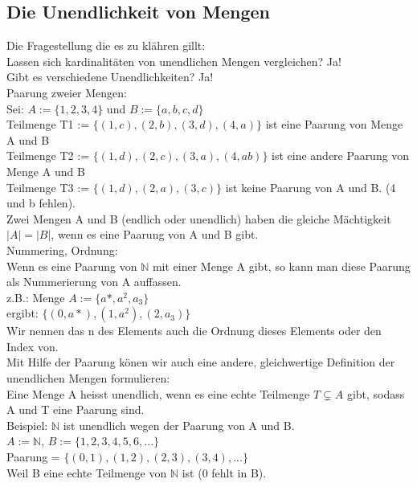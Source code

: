 \documentclass[../gruppenarbeit_1.tex]{subfiles}
\begin{document}
\subsection{Die Unendlichkeit von Mengen}

Die Fragestellung die es zu klähren gillt:\\
Lassen sich kardinalitäten von unendlichen Mengen vergleichen? Ja!\\
Gibt es verschiedene Unendlichkeiten? Ja!\\

Paarung zweier Mengen:\\
Sei: $A := \{1,2,3,4\}$ und $B := \{a,b,c,d\}$\\
Teilmenge T1 := $\{(1,c),(2,b),(3,d),(4,a)\}$ ist eine Paarung von Menge A und B\\
Teilmenge T2 := $\{(1,d),(2,c),(3,a),(4,ab)\}$ ist eine andere Paarung von Menge A und B\\
Teilmenge T3 := $\{(1,d),(2,a),(3,c)\}$ ist keine Paarung von A und B. (4 und b fehlen).\\

Zwei Mengen A und B (endlich oder unendlich) haben die gleiche Mächtigkeit $|A| = |B|$, wenn es eine Paarung von A und B gibt.\\

Nummering, Ordnung:\\
Wenn es eine Paarung von $\mathbb{N}$ mit einer Menge A gibt, so kann man diese Paarung als Nummerierung von A auffassen. \\
z.B.: Menge $A := \{a*,a^2, a_3\}$\\
ergibt: $\{(0,a*),(1,a^2),(2,a_3)\}$\\

Wir nennen das n des Elements auch die Ordnung dieses Elements oder den Index von.\\

Mit Hilfe der Paarung könen wir auch eine andere, gleichwertige Definition der unendlichen Mengen formulieren:\\
Eine Menge A heisst unendlich, wenn es eine echte Teilmenge $T \subsetneq A$ gibt, sodass A und T eine Paarung sind.\\
Beispiel: $\mathbb{N}$ ist unendlich wegen der Paarung von A und B.\\
$A := \mathbb{N}$, $B := \{1,2,3,4,5,6,...\}$\\
Paarung = $\{(0,1),(1,2),(2,3),(3,4),...\}$\\
Weil B eine echte Teilmenge von $\mathbb{N}$ ist (0 fehlt in B).\\
\end{document}
